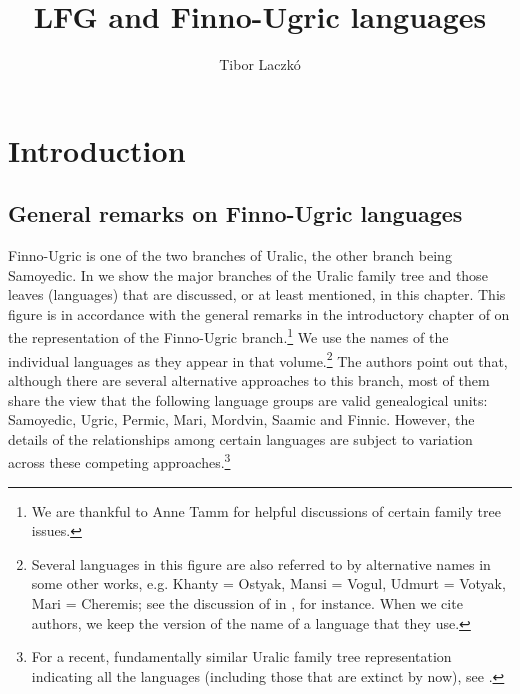 \documentclass[output=paper,hidelinks]{langscibook}
\title{LFG and Finno-Ugric languages}
\author{Tibor Laczkó\affiliation{Károli Gáspár University of the Reformed Church in Hungary}}
\begin{document}
\maketitle
\label{chap:FinnoUgric}

\section{Introduction}
\label{sec:FinnoUgric:1}
\subsection{General remarks on Finno-Ugric languages}
\label{sec:FinnoUgric:1.1}

\largerpage[-1]
Finno-Ugric is one of the two branches of Uralic, the other branch being Samoyedic. In  we show the major branches of the Uralic family tree and those leaves (languages) that are discussed, or at least mentioned, in this chapter. This figure is in accordance with the general remarks in the introductory chapter of \citet{MiestamoTammWagnerNagy2015} on the representation of the Finno-Ugric branch.\footnote{We are thankful to Anne Tamm for helpful discussions of certain family tree issues.} We use the names of the individual languages as they appear in that volume.\footnote{Several languages in this figure are also referred to by alternative names in some other works, e.g. Khanty = Ostyak, Mansi = Vogul, Udmurt = Votyak, Mari = Cheremis; see the discussion of \citet{DN} in , for instance. When we cite authors, we keep the version of the name of a language that they use.} The authors point out that, although there are several alternative approaches to this branch, most of them share the view that the following language groups are valid genealogical units: Samoyedic, Ugric, Permic, Mari, Mordvin, Saamic and Finnic. However, the details of the relationships among certain languages are subject to variation across these competing approaches.\footnote{For a recent, fundamentally similar Uralic family tree representation indicating all the languages (including those that are extinct by now), see \citet{Maticsak2020}.}
\end{document}

